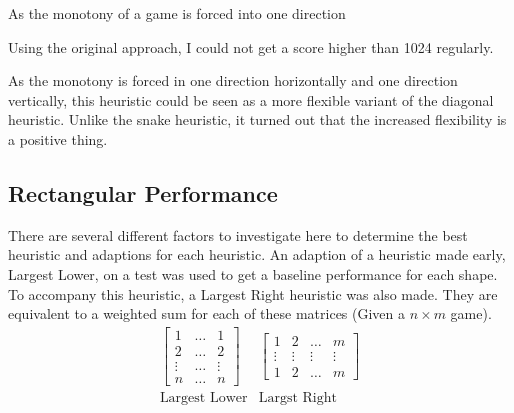 \documentclass{article}
\begin{document}
As the monotony of a game is forced into one direction 

Using the original approach, I could not get a score higher than 1024 regularly.

As the monotony is forced in one direction horizontally and one direction vertically, this heuristic could be seen as a more flexible variant of the diagonal heuristic. Unlike the snake heuristic, it turned out that the increased flexibility is a positive thing.

\subsection{Rectangular Performance}
There are several different factors to investigate here to determine the best heuristic and adaptions for each heuristic. An adaption of a heuristic made early, Largest Lower, on a test was used to get a baseline performance for each shape. To accompany this heuristic, a Largest Right heuristic was also made. They are equivalent to a weighted sum for each of these matrices (Given a $n \times m$ game).
$$
\begin{matrix}
    \begin{bmatrix}
        1 & \hdots & 1 \\
        2 & \hdots & 2 \\
        \vdots & \hdots & \vdots \\
        n & \hdots & n
    \end{bmatrix}
    &
        \begin{bmatrix}
        1 & 2 & \hdots & m\\
        \vdots & \vdots & \vdots  &\vdots\\
        1 & 2 & \hdots & m
    \end{bmatrix}
    \\
    \text{Largest Lower}&\text{Largst Right}
\end{matrix}
$$
\end{document}
